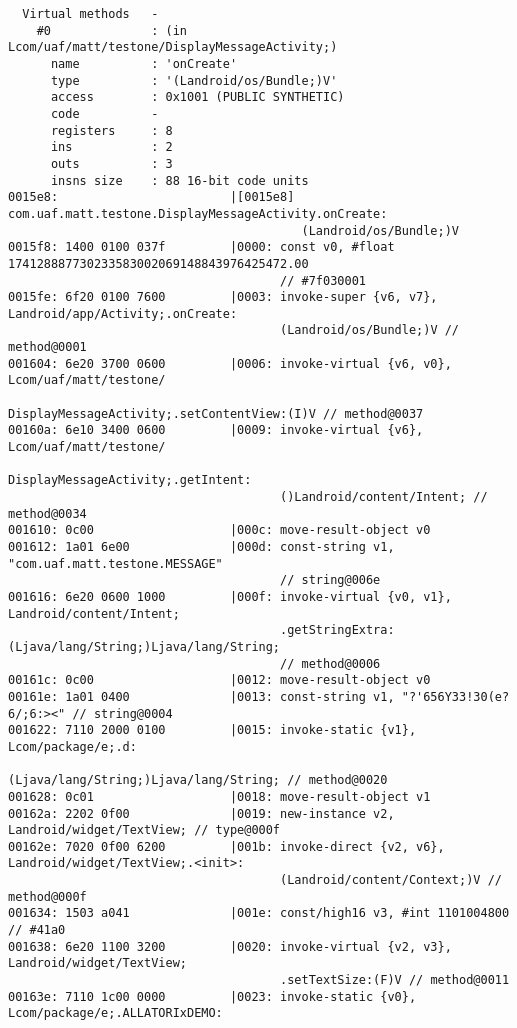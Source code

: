 \begin{lstlisting}
  Virtual methods   -
    #0              : (in Lcom/uaf/matt/testone/DisplayMessageActivity;)
      name          : 'onCreate'
      type          : '(Landroid/os/Bundle;)V'
      access        : 0x1001 (PUBLIC SYNTHETIC)
      code          -
      registers     : 8
      ins           : 2
      outs          : 3
      insns size    : 88 16-bit code units
0015e8:                        |[0015e8] com.uaf.matt.testone.DisplayMessageActivity.onCreate:
                                         (Landroid/os/Bundle;)V
0015f8: 1400 0100 037f         |0000: const v0, #float 174128887730233583002069148843976425472.00
                                      // #7f030001
0015fe: 6f20 0100 7600         |0003: invoke-super {v6, v7}, Landroid/app/Activity;.onCreate:
                                      (Landroid/os/Bundle;)V // method@0001
001604: 6e20 3700 0600         |0006: invoke-virtual {v6, v0}, Lcom/uaf/matt/testone/
                                      DisplayMessageActivity;.setContentView:(I)V // method@0037
00160a: 6e10 3400 0600         |0009: invoke-virtual {v6}, Lcom/uaf/matt/testone/
                                      DisplayMessageActivity;.getIntent:
                                      ()Landroid/content/Intent; // method@0034
001610: 0c00                   |000c: move-result-object v0
001612: 1a01 6e00              |000d: const-string v1, "com.uaf.matt.testone.MESSAGE"
                                      // string@006e
001616: 6e20 0600 1000         |000f: invoke-virtual {v0, v1}, Landroid/content/Intent;
                                      .getStringExtra:(Ljava/lang/String;)Ljava/lang/String;
                                      // method@0006
00161c: 0c00                   |0012: move-result-object v0
00161e: 1a01 0400              |0013: const-string v1, "?'656Y33!30(e?6/;6:><" // string@0004
001622: 7110 2000 0100         |0015: invoke-static {v1}, Lcom/package/e;.d:
                                      (Ljava/lang/String;)Ljava/lang/String; // method@0020
001628: 0c01                   |0018: move-result-object v1
00162a: 2202 0f00              |0019: new-instance v2, Landroid/widget/TextView; // type@000f
00162e: 7020 0f00 6200         |001b: invoke-direct {v2, v6}, Landroid/widget/TextView;.<init>:
                                      (Landroid/content/Context;)V // method@000f
001634: 1503 a041              |001e: const/high16 v3, #int 1101004800 // #41a0
001638: 6e20 1100 3200         |0020: invoke-virtual {v2, v3}, Landroid/widget/TextView;
                                      .setTextSize:(F)V // method@0011
00163e: 7110 1c00 0000         |0023: invoke-static {v0}, Lcom/package/e;.ALLATORIxDEMO:

\end{lstlisting}
